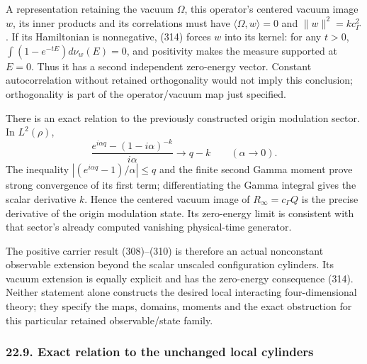 \documentclass[
  11pt,
]{article}
\begin{document}
A representation retaining the vacuum \(\Omega\), this operator's
centered vacuum image \(w\), its inner products and its correlations
must have \(\langle\Omega,w\rangle=0\) and \(\|w\|^2=k c_\Gamma^2\). If
its Hamiltonian is nonnegative, (314) forces \(w\) into its kernel: for
any \(t>0\), \(\int(1-e^{-tE})d\nu_w(E)=0\), and positivity makes the
measure supported at \(E=0\). Thus it has a second independent
zero-energy vector. Constant autocorrelation without retained
orthogonality would not imply this conclusion; orthogonality is part of
the operator/vacuum map just specified.

There is an exact relation to the previously constructed origin
modulation sector. In \(L^2(\rho)\), \[
 \frac{e^{i\alpha q}-(1-i\alpha)^{-k}}{i\alpha}
       \longrightarrow q-k\qquad(\alpha\to0).
 \tag{315}
\] The inequality \(|(e^{i\alpha q}-1)/\alpha|\le q\) and the finite
second Gamma moment prove strong convergence of its first term;
differentiating the Gamma integral gives the scalar derivative \(k\).
Hence the centered vacuum image of \(R_\infty=c_\Gamma Q\) is the
precise derivative of the origin modulation state. Its zero-energy limit
is consistent with that sector's already computed vanishing
physical-time generator.

The positive carrier result (308)--(310) is therefore an actual
nonconstant observable extension beyond the scalar unscaled
configuration cylinders. Its vacuum extension is equally explicit and
has the zero-energy consequence (314). Neither statement alone
constructs the desired local interacting four-dimensional theory; they
specify the maps, domains, moments and the exact obstruction for this
particular retained observable/state family.

\subsubsection{22.9. Exact relation to the unchanged local
cylinders}\label{exact-relation-to-the-unchanged-local-cylinders}
\end{document}
